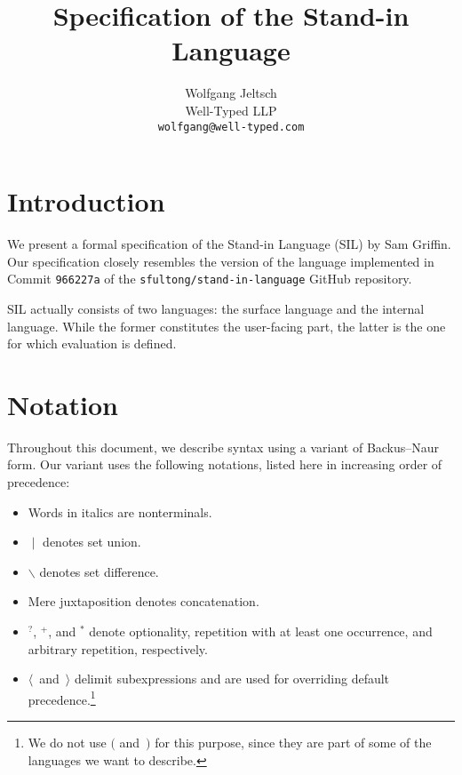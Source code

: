 \documentclass{scrartcl}
\title{Specification of the Stand-in Language}
\author{%
    Wolfgang Jeltsch\\
    \small Well-Typed LLP\\
    \small\texttt{wolfgang@well-typed.com}%
}
\newcommand{\optional}{^?}
\newcommand{\some}{^+}
\newcommand{\many}{^*}
\begin{document}
\maketitle

\section{Introduction}

We present a formal specification of the Stand-in Language (SIL) by Sam
Griffin. Our specification closely resembles the version of the language
implemented in Commit \texttt{966227a} of the
\texttt{sfultong/stand-in-language} GitHub repository.

SIL actually consists of two languages: the surface language and the
internal language. While the former constitutes the user-facing part,
the latter is the one for which evaluation is defined.

\section{Notation}

Throughout this document, we describe syntax using a variant of
Backus–Naur form. Our variant uses the following notations, listed here
in increasing order of precedence:
\begin{itemize}

\item

Words in italics are nonterminals.

\item

$∣$ denotes set union.

\item

$∖$ denotes set difference.

\item

Mere juxtaposition denotes concatenation.

\item

$\optional$, $\some$, and $\many$ denote optionality, repetition with at
least one occurrence, and arbitrary repetition, respectively.

\item

$⟨$~and~$⟩$ delimit subexpressions and are used for overriding default
precedence.\footnote{We do not use $($ and~$)$ for this purpose, since
they are part of some of the languages we want to describe.}

\end{itemize}
\end{document}

